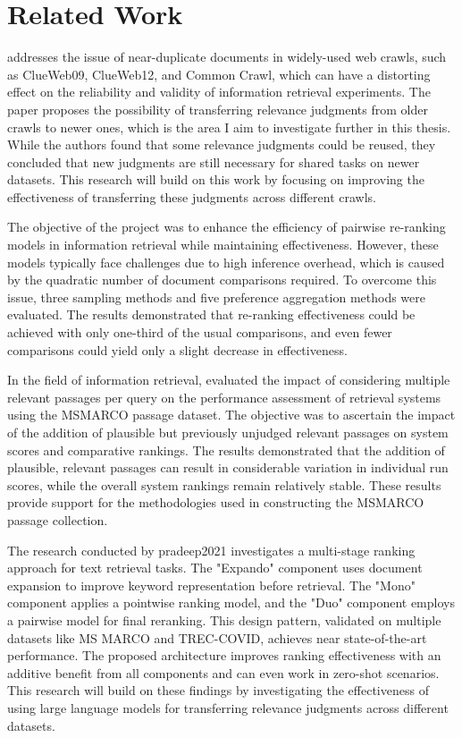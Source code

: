 \chapter{Related Work}\label{related-work}

\cite{froebe:2021} addresses the issue of near-duplicate documents in widely-used web crawls, such as ClueWeb09, ClueWeb12, and Common Crawl, which can have a distorting effect on the reliability and validity of information retrieval experiments. The paper proposes the possibility of transferring relevance judgments from older crawls to newer ones, which is the area I aim to investigate further in this thesis. While the authors found that some relevance judgments could be reused, they concluded that new judgments are still necessary for shared tasks on newer datasets. This research will build on this work by focusing on improving the effectiveness of transferring these judgments across different crawls.

The objective of the \citet{gienapp:2022} project was to enhance the efficiency of pairwise re-ranking models in information retrieval while maintaining effectiveness. However, these models typically face challenges due to high inference overhead, which is caused by the quadratic number of document comparisons required. To overcome this issue, three sampling methods and five preference aggregation methods were evaluated. The results demonstrated that re-ranking effectiveness could be achieved with only one-third of the usual comparisons, and even fewer comparisons could yield only a slight decrease in effectiveness.

In the field of information retrieval, \citet{mackenzie:2021} evaluated the impact of considering multiple relevant passages per query on the performance assessment of retrieval systems using the MSMARCO passage dataset. The objective was to ascertain the impact of the addition of plausible but previously unjudged relevant passages on system scores and comparative rankings. The results demonstrated that the addition of plausible, relevant passages can result in considerable variation in individual run scores, while the overall system rankings remain relatively stable. These results provide support for the methodologies used in constructing the MSMARCO passage collection.

The research conducted by pradeep2021 investigates a multi-stage ranking approach for text retrieval tasks. The "Expando" component uses document expansion to improve keyword representation before retrieval. The "Mono" component applies a pointwise ranking model, and the "Duo" component employs a pairwise model for final reranking. This design pattern, validated on multiple datasets like MS MARCO and TREC-COVID, achieves near state-of-the-art performance. The proposed architecture improves ranking effectiveness with an additive benefit from all components and can even work in zero-shot scenarios. This research will build on these findings by investigating the effectiveness of using large language models for transferring relevance judgments across different datasets.

